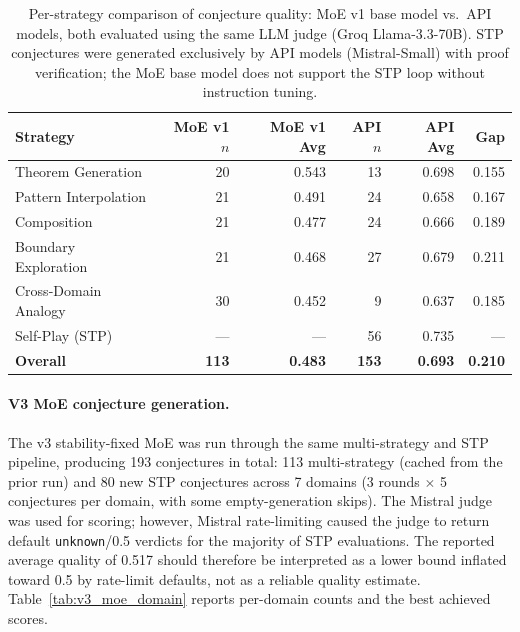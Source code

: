 \documentclass[11pt,a4paper]{article}
\begin{document}
\begin{table}[t]
\centering
\caption{Per-strategy comparison of conjecture quality: MoE v1 base model vs.\ API models, both evaluated using the same LLM judge (Groq Llama-3.3-70B). STP conjectures were generated exclusively by API models (Mistral-Small) with proof verification; the MoE base model does not support the STP loop without instruction tuning.}
\label{tab:moe_vs_api_strategy}
\small
\begin{tabular}{@{}lrrrrr@{}}
\toprule
\textbf{Strategy} & \textbf{MoE v1 $n$} & \textbf{MoE v1 Avg} & \textbf{API $n$} & \textbf{API Avg} & \textbf{Gap} \\
\midrule
Theorem Generation    & 20 & 0.543 & 13 & 0.698 & 0.155 \\
Pattern Interpolation & 21 & 0.491 & 24 & 0.658 & 0.167 \\
Composition           & 21 & 0.477 & 24 & 0.666 & 0.189 \\
Boundary Exploration  & 21 & 0.468 & 27 & 0.679 & 0.211 \\
Cross-Domain Analogy  & 30 & 0.452 &  9 & 0.637 & 0.185 \\
Self-Play (STP)       & --- & ---   & 56 & 0.735 & ---   \\
\midrule
\textbf{Overall}      & \textbf{113} & \textbf{0.483} & \textbf{153} & \textbf{0.693} & \textbf{0.210} \\
\bottomrule
\end{tabular}
\end{table}

\paragraph{V3 MoE conjecture generation.}
The v3 stability-fixed MoE was run through the same multi-strategy and STP pipeline, producing 193 conjectures in total: 113 multi-strategy (cached from the prior run) and 80 new STP conjectures across 7 domains (3 rounds $\times$ 5 conjectures per domain, with some empty-generation skips). The Mistral judge was used for scoring; however, Mistral rate-limiting caused the judge to return default \texttt{unknown}/0.5 verdicts for the majority of STP evaluations. The reported average quality of 0.517 should therefore be interpreted as a lower bound inflated toward 0.5 by rate-limit defaults, not as a reliable quality estimate. Table~\ref{tab:v3_moe_domain} reports per-domain counts and the best achieved scores.
\end{document}
